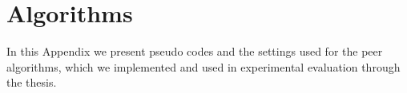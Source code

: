 \chapter{Algorithms}
\label{cha:peers}


In this Appendix we present pseudo codes and the settings used for the peer algorithms, which we implemented and used in experimental evaluation through the thesis.
